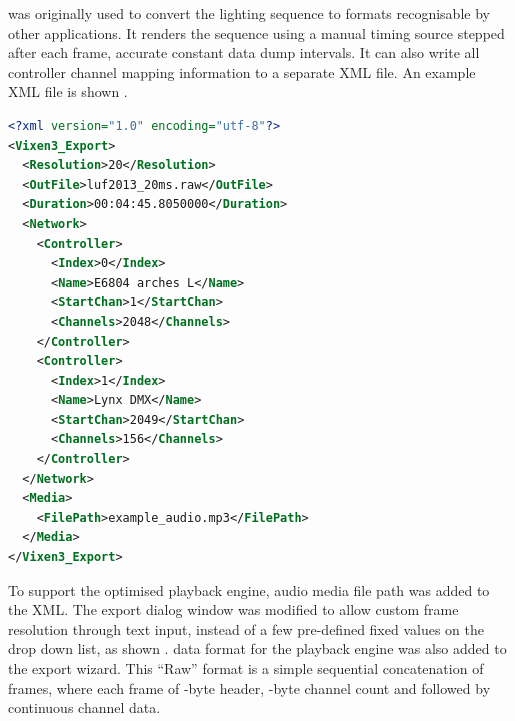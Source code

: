 


 was originally used to convert the lighting sequence to formats recognisable by other  applications. It renders the sequence using a manual timing source stepped after each frame,  accurate constant data dump intervals. It can also write all controller channel mapping information to a separate XML file. An example XML file is shown  .

\begin{lstlisting}[float,floatplacement=ht,language=XML,label=lst:network_xml,captionpos=b,caption={\footnotesize Example controller mapping XML file}]
<?xml version="1.0" encoding="utf-8"?>
<Vixen3_Export>
  <Resolution>20</Resolution>
  <OutFile>luf2013_20ms.raw</OutFile>
  <Duration>00:04:45.8050000</Duration>
  <Network>
    <Controller>
      <Index>0</Index>
      <Name>E6804 arches L</Name>
      <StartChan>1</StartChan>
      <Channels>2048</Channels>
    </Controller>
    <Controller>
      <Index>1</Index>
      <Name>Lynx DMX</Name>
      <StartChan>2049</StartChan>
      <Channels>156</Channels>
    </Controller>
  </Network>
  <Media>
    <FilePath>example_audio.mp3</FilePath>
  </Media>
</Vixen3_Export>
\end{lstlisting}

To support the  optimised playback engine,  audio media file path was added to the XML. The export dialog window was modified to allow custom frame resolution through text input, instead of a few pre-defined fixed values on the drop down list, as shown  .  data format  for the playback engine was also added to the export wizard. This ``Raw'' format is a simple sequential concatenation of frames, where each frame  of -byte header, -byte channel count and  followed by continuous channel data.


